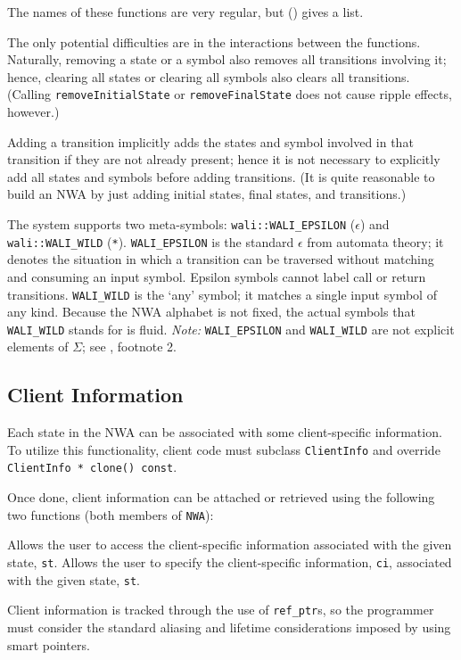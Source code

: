 The names of these functions are very regular, but
 () gives a list.

The only potential difficulties are in the interactions between the
functions. Naturally, removing a state or a symbol also removes all
transitions involving it; hence, clearing all states or clearing all symbols
also clears all transitions. (Calling \texttt{removeInitialState} or \texttt{removeFinalState}
does not cause ripple effects, however.)

Adding a transition implicitly adds the states and symbol involved in that
transition if they are not already present; hence it is not necessary to
explicitly add all states and symbols before adding transitions. (It is quite
reasonable to build an NWA by just adding initial states, final states, and
transitions.)


The system supports two meta-symbols: \texttt{wali::WALI\_EPSILON}
(\texttt{$\epsilon$}) and \texttt{wali::WALI\_WILD} (\texttt{*}).
\texttt{WALI\_EPSILON} is the standard $\epsilon$ from automata theory; it
denotes the situation in which a transition can be traversed without matching
and consuming an input symbol.  Epsilon symbols cannot label call or return
transitions. \texttt{WALI\_WILD} is the `any' symbol; it matches a single input
symbol of any kind.  Because the NWA alphabet is not fixed, the actual symbols
that \texttt{WALI\_WILD} stands for is fluid.  \textsl{Note:}
\texttt{WALI\_EPSILON} and \texttt{WALI\_WILD} are not explicit
elements of $\Sigma$; see , footnote 2. 



\subsection{Client Information}
\label{Se:client-info}

Each state in the NWA can be associated with some client-specific
information. To utilize this functionality, client code must subclass
\texttt{ClientInfo} and override \texttt{ClientInfo * clone() const}.

Once done, client information can be attached or retrieved using the
following two functions (both members of \texttt{NWA}):
\begin{functionlist}
    Allows the user to access the client-specific information associated with
    the given state, \texttt{st}.
    Allows the user to specify the client-specific information, \texttt{ci},
    associated with the given state, \texttt{st}. \\
\end{functionlist}
Client information is tracked through the use of \texttt{ref\_ptr}s, so the
programmer must consider the standard aliasing and lifetime considerations
imposed by using smart pointers.

